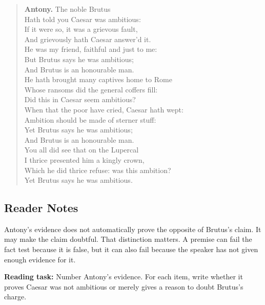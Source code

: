 \documentclass[12pt]{article}
\newenvironment{playpassage}{\begin{quote}\small\setlength{\parskip}{0.18em}\setlength{\parindent}{0pt}}{\end{quote}}
\newcommand{\speaker}[1]{\textbf{#1.}}
\begin{document}
\begin{playpassage}
\speaker{Antony} The noble Brutus\\
Hath told you Caesar was ambitious:\\
If it were so, it was a grievous fault,\\
And grievously hath Caesar answer'd it.\\
He was my friend, faithful and just to me:\\
But Brutus says he was ambitious;\\
And Brutus is an honourable man.\\
He hath brought many captives home to Rome\\
Whose ransoms did the general coffers fill:\\
Did this in Caesar seem ambitious?\\
When that the poor have cried, Caesar hath wept:\\
Ambition should be made of sterner stuff:\\
Yet Brutus says he was ambitious;\\
And Brutus is an honourable man.\\
You all did see that on the Lupercal\\
I thrice presented him a kingly crown,\\
Which he did thrice refuse: was this ambition?\\
Yet Brutus says he was ambitious.
\end{playpassage}

\subsection*{Reader Notes}

Antony's evidence does not automatically prove the opposite of Brutus's claim. It may make the claim doubtful. That distinction matters. A premise can fail the fact test because it is false, but it can also fail because the speaker has not given enough evidence for it.

\textbf{Reading task:} Number Antony's evidence. For each item, write whether it proves Caesar was not ambitious or merely gives a reason to doubt Brutus's charge.
\end{document}
